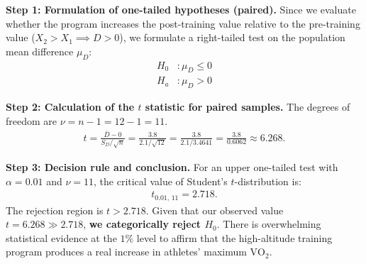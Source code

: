 \begin{solproblema}
	\textbf{Step 1: Formulation of one-tailed hypotheses (paired).}
	Since we evaluate whether the program increases the post-training value relative to the pre-training value ($X_2 > X_1 \implies D > 0$), we formulate a right-tailed test on the population mean difference $\mu_D$:
	\begin{align}
		H_0&: \mu_D \leq 0 \\
		H_a&: \mu_D > 0
	\end{align}
	
	\textbf{Step 2: Calculation of the $t$ statistic for paired samples.}
	The degrees of freedom are $\nu = n - 1 = 12 - 1 = 11$.
	\begin{align}
		t = \frac{\bar{D} - 0}{S_D / \sqrt{n}} = \frac{3.8}{2.1 / \sqrt{12}} = \frac{3.8}{2.1 / 3.4641} = \frac{3.8}{0.6062} \approx 6.268.
	\end{align}
	
	\textbf{Step 3: Decision rule and conclusion.}
	For an upper one-tailed test with $\alpha = 0.01$ and $\nu = 11$, the critical value of Student's $t$-distribution is:
	\begin{align}
		t_{0.01, \, 11} = 2.718.
	\end{align}
	The rejection region is $t > 2.718$. Given that our observed value $t = 6.268 \gg 2.718$, \textbf{we categorically reject $H_0$}. There is overwhelming statistical evidence at the $1\%$ level to affirm that the high-altitude training program produces a real increase in athletes' maximum $\text{VO}_2$.
\end{solproblema}

